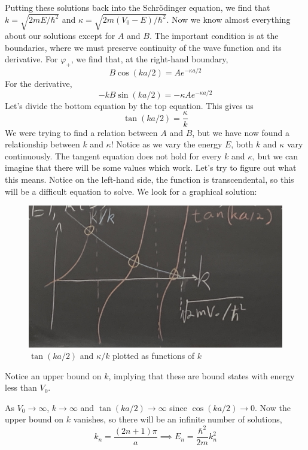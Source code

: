 \documentclass[a4paper,twoside,master.tex]{subfiles}
\begin{document}
Putting these solutions back into the Schr\"odinger equation, we find that $ k = \sqrt{2mE/ \hbar^2} $ and $ \kappa = \sqrt{2m (V_0 - E)/ \hbar^2} $. Now we know almost everything about our solutions except for $ A $ and $ B $. The important condition is at the boundaries, where we must preserve continuity of the wave function and its derivative. For $ \varphi_+ $, we find that, at the right-hand boundary,
\begin{equation}
    B \cos(k a/2) = A e^{- \kappa a/2}
\end{equation}
For the derivative,
\begin{equation}
    -kB \sin(k a/2) = - \kappa A e^{- \kappa a/2}
\end{equation}
Let's divide the bottom equation by the top equation. This gives us
\begin{equation}
    \tan(k a/2) = \frac{\kappa}{k}
\end{equation}
We were trying to find a relation between $ A $ and $ B $, but we have now found a relationship between $ k $ and $ \kappa $! Notice as we vary the energy $ E $, both $ k $ and $\kappa$ vary continuously. The tangent equation does not hold for every $ k $ and $\kappa$, but we can imagine that there will be some values which work. Let's try to figure out what this means. Notice on the left-hand side, the function is transcendental, so this will be a difficult equation to solve. We look for a graphical solution:

\begin{figure}[h]
    \centering
    \includegraphics[width=0.5\columnwidth]{figures/lec_28_kappa_vs_k.jpg}
    \caption{$ \tan(ka/2) $ and $ \kappa / k $ plotted as functions of $ k $}
    \label{fig:k_kappa_relation}
\end{figure}

Notice an upper bound on $ k $, implying that these are bound states with energy less than $ V_0 $.

As $ V_0 \to \infty $, $ k \to \infty $ and $ \tan(k a/2) \to \infty $ since $ \cos(k a/2) \to 0 $. Now the upper bound on $ k $ vanishes, so there will be an infinite number of solutions,
\begin{equation}
    k_n = \frac{(2n+1) \pi}{a} \implies E_n = \frac{\hbar^2}{2m} k_n^2
\end{equation}
\end{document}
